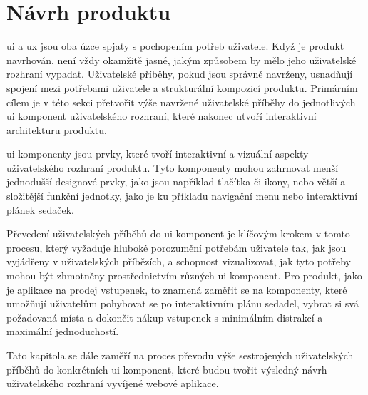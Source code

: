 \section{Návrh produktu}
\label{sec:navrh-ui-navrh-produktu}
\acl{ui} a \acl{ux} jsou oba úzce spjaty s pochopením potřeb uživatele.
Když je produkt navrhován, není vždy okamžitě jasné, jakým způsobem by mělo jeho uživatelské rozhraní vypadat.
Uživatelské příběhy, pokud jsou správně navrženy, usnadňují spojení mezi potřebami uživatele a strukturální kompozicí produktu.
Primárním cílem je v této sekci přetvořit výše navržené uživatelské příběhy do jednotlivých \ac{ui} komponent uživatelského rozhraní, které nakonec utvoří interaktivní architekturu produktu.

\ac{ui} komponenty jsou prvky, které tvoří interaktivní a vizuální aspekty uživatelského rozhraní produktu.
Tyto komponenty mohou zahrnovat menší jednodušší designové prvky, jako jsou například tlačítka či ikony, nebo větší a složitější funkční jednotky, jako je ku příkladu navigační menu nebo interaktivní plánek sedaček.

Převedení uživatelských příběhů do \ac{ui} komponent je klíčovým krokem v tomto procesu, který vyžaduje hluboké porozumění potřebám uživatele tak, jak jsou vyjádřeny v uživatelských příbězích, a schopnost vizualizovat, jak tyto potřeby mohou být zhmotněny prostřednictvím různých \ac{ui} komponent.
Pro produkt, jako je aplikace na prodej vstupenek, to znamená zaměřit se na komponenty, které umožňují uživatelům pohybovat se po interaktivním plánu sedadel, vybrat si svá požadovaná místa a dokončit nákup vstupenek s minimálním distrakcí a maximální jednoduchostí.

Tato kapitola se dále zaměří na proces převodu výše sestrojených uživatelských příběhů do konkrétních \ac{ui} komponent, které budou tvořit výsledný návrh uživatelského rozhraní vyvíjené webové aplikace.

